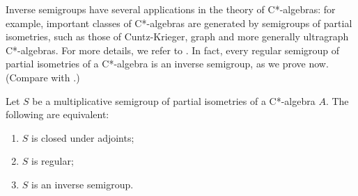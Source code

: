 Inverse semigroups have several applications in the theory of C*-algebras: for example, important classes of C*-algebras are generated by semigroups of partial isometries, such as those of Cuntz-Krieger, graph and more generally ultragraph C*-algebras. For more details, we refer to \cite{MR3699795,MR2457327,MR2050134}. In fact, every regular semigroup of partial isometries of a C*-algebra is an inverse semigroup, as we prove now. (Compare with \cite[Proposition 2.1.4]{MR1724106}.)

\begin{proposition}
Let $S$ be a multiplicative semigroup of partial isometries of a C*-algebra $A$. The following are equivalent:
\begin{enumerate}
\item[(1)] $S$ is closed under adjoints;
\item[(2)] $S$ is regular;
\item[(3)] $S$ is an inverse semigroup.
\end{enumerate}
\end{proposition}
